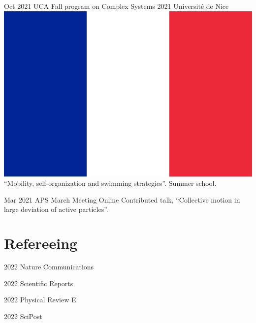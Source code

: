 \documentclass[letterpaper]{cvtemplate_en} %
\begin{document}
\begin{cvbody}
\cvitem
	{Oct 2021}
	{}
	{UCA Fall program on Complex Systems 2021}
	{Universit\'e de Nice \includegraphics[height=0.8\myheight]{fr}}
	{}{}{}
	{}
	{``Mobility, self-organization and swimming strategies''. Summer school.\\}

\cvitem
	{Mar 2021}
	{}
	{APS March Meeting}
	{Online \faGlobe}
	{}{}{}
	{}
	{Contributed talk, ``Collective motion in large deviation of active particles''.\\}

\end{cvbody}


\section{Refereeing}

\begin{cvbody}

\cvitem
	{2022}
	{}
	{Nature Communications}
	{\vspace{-5pt}}
	{}{}{}
	{}
	{}

\cvitem
	{2022}
	{}
	{Scientific Reports}
	{}
	{}{}{}
	{}
	{}

\cvitem
	{2022}
	{}
	{Physical Review E}
	{}
	{}{}{}
	{}
	{}

\cvitem
	{2022}
	{}
	{SciPost}
	{}
	{}{}{}
	{}
	{}

\end{cvbody}

\end{document}
